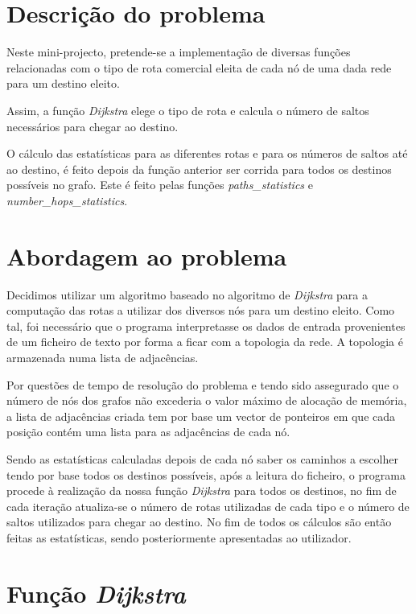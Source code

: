 \documentclass[a4paper]{article}
\begin{document}


\section{Descrição do problema}
Neste mini-projecto, pretende-se a implementação de diversas funções relacionadas com o tipo de rota comercial eleita de cada nó de uma dada rede para um destino eleito.

Assim, a função \textit{Dijkstra} elege o tipo de rota e calcula o número de saltos necessários para chegar ao destino.

O cálculo das estatísticas para as diferentes rotas e para os números de saltos até ao destino, é feito depois da função anterior ser corrida para todos os destinos possíveis no grafo. Este é feito pelas funções \textit{paths\_statistics} e \textit{number\_hops\_statistics}.

\section{Abordagem ao problema}
Decidimos utilizar um algoritmo baseado no algoritmo de \textit{Dijkstra} para a computação das rotas a utilizar dos diversos nós para um destino eleito. Como tal, foi necessário que o programa interpretasse os dados de entrada provenientes de um ficheiro de texto por forma a ficar com a topologia da rede. A topologia é armazenada numa lista de adjacências.

Por questões de tempo de resolução do problema e tendo sido assegurado que o número de nós dos grafos não excederia o valor máximo de alocação de memória, a lista de adjacências criada tem por base um vector de ponteiros em que cada posição contém uma lista para as adjacências de cada nó.

Sendo as estatísticas calculadas depois de cada nó saber os caminhos a escolher tendo por base todos os destinos possíveis, após a leitura do ficheiro, o programa procede à realização da nossa função \textit{Dijkstra} para todos os destinos, no fim de cada iteração atualiza-se o número de rotas utilizadas de cada tipo e o número de saltos utilizados para chegar ao destino. No fim de todos os cálculos são então feitas as estatísticas, sendo posteriormente apresentadas ao utilizador.

\section{Função \textit{Dijkstra}}
\end{document}
